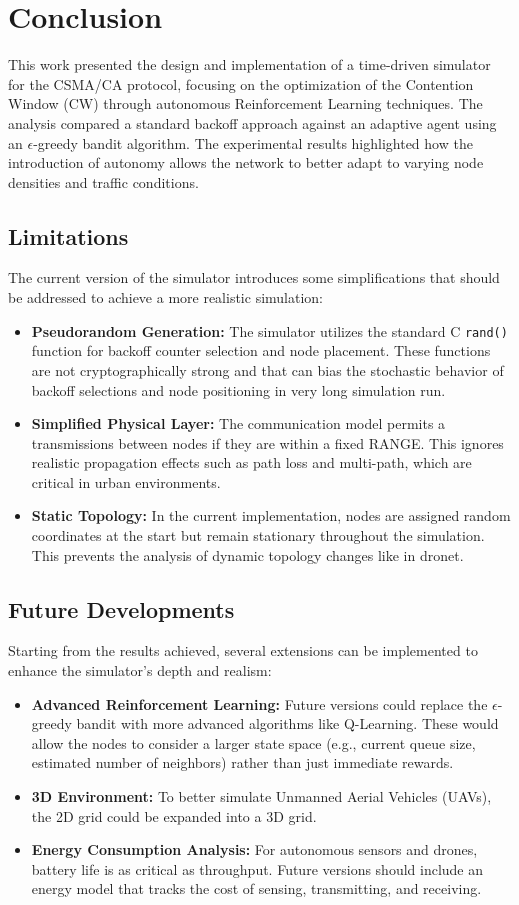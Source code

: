 \chapter{Conclusion}
This work presented the design and implementation of a time-driven simulator for the CSMA/CA protocol, focusing on the optimization of the Contention Window (CW) through autonomous Reinforcement Learning techniques. The analysis compared a standard backoff approach against an adaptive agent using an $\epsilon$-greedy bandit algorithm. The experimental results highlighted how the introduction of autonomy allows the network to better adapt to varying node densities and traffic conditions.

\section{Limitations}

The current version of the simulator introduces some simplifications that should be addressed to achieve a more realistic simulation:
\begin{itemize}
    \item \textbf{Pseudorandom Generation:} The simulator utilizes the standard C \texttt{rand()} function for backoff counter selection and node placement. These functions are not cryptographically strong and that can bias the stochastic behavior of backoff selections and node positioning in very long simulation run.
    \item \textbf{Simplified Physical Layer:} The communication model permits a transmissions between nodes if they are within a fixed RANGE. This ignores realistic propagation effects such as path loss and multi-path, which are critical in urban environments.
    \item \textbf{Static Topology:} In the current implementation, nodes are assigned random coordinates at the start but remain stationary throughout the simulation. This prevents the analysis of dynamic topology changes like in dronet.
\end{itemize}

\section{Future Developments}
Starting from the results achieved, several extensions can be implemented to enhance the simulator's depth and realism:
\begin{itemize}
    \item \textbf{Advanced Reinforcement Learning:} Future versions could replace the $\epsilon$-greedy bandit with more advanced algorithms like Q-Learning. These would allow the nodes to consider a larger state space (e.g., current queue size, estimated number of neighbors) rather than just immediate rewards.
    \item \textbf{3D Environment:} To better simulate Unmanned Aerial Vehicles (UAVs), the 2D grid could be expanded into a 3D grid.
    \item \textbf{Energy Consumption Analysis:} For autonomous sensors and drones, battery life is as critical as throughput. Future versions should include an energy model that tracks the cost of sensing, transmitting, and receiving.
\end{itemize}
